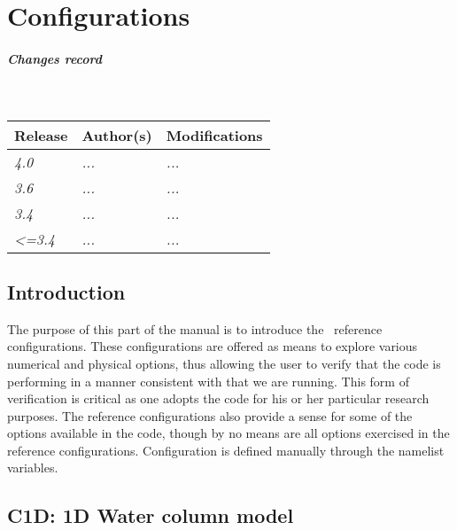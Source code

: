 \documentclass[../main/NEMO_manual]{subfiles}
\begin{document}
\chapter{Configurations}
\label{chap:CFGS}

\chaptertoc

\paragraph{Changes record} ~\\

{\footnotesize
  \begin{tabularx}{\textwidth}{l||X|X}
    Release & Author(s) & Modifications \\
    \hline
    {\em   4.0} & {\em ...} & {\em ...} \\
    {\em   3.6} & {\em ...} & {\em ...} \\
    {\em   3.4} & {\em ...} & {\em ...} \\
    {\em <=3.4} & {\em ...} & {\em ...}
  \end{tabularx}
}

\clearpage

\section{Introduction}
\label{sec:CFGS_intro}

The purpose of this part of the manual is to introduce the \NEMO\ reference configurations.
These configurations are offered as means to explore various numerical and physical options,
thus allowing the user to verify that the code is performing in a manner consistent with that we are running.
This form of verification is critical as one adopts the code for his or her particular research purposes.
The reference configurations also provide a sense for some of the options available in the code,
though by no means are all options exercised in the reference configurations.
Configuration is defined manually through the  namelist variables.

\begin{listing}
  \caption{}
  \label{lst:namcfg}
\end{listing}

\section[C1D: 1D Water column model]{C1D: 1D Water column model}
\label{sec:CFGS_c1d}
\end{document}
